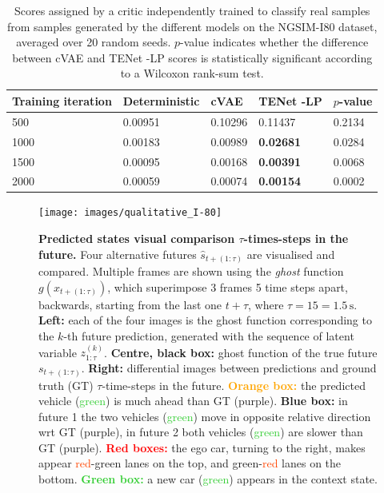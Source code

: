 \documentclass{article}
\newcommand{\modelname}{TENet }
\begin{document}
\begin{table}[t!]
  \caption{Scores assigned by a critic independently trained to classify real samples from samples generated by the different models on the NGSIM-I80 dataset, averaged over 20 random seeds. $p$-value indicates whether the difference between cVAE and \modelname-LP scores is statistically significant according to a Wilcoxon rank-sum test.}
  \label{critic-table}
  \centering
  \begin{tabular}{l|l|lll}
    \toprule
    Training iteration     & Deterministic & cVAE & \modelname-LP & $p$-value \\
    \midrule
    500 & 0.00951 & 0.10296 & 0.11437 & 0.2134 \\
    1000 & 0.00183 & 0.00989 & \textbf{0.02681} & 0.0284 \\
    1500 & 0.00095 & 0.00168 & \textbf{0.00391} & 0.0068 \\
    2000 & 0.00059 & 0.00074 & \textbf{0.00154} & 0.0002 \\
    \bottomrule
  \end{tabular}
\end{table}



\begin{figure}[t!]
  \centering
  \texttt{[image: images/qualitative\_I-80]}
  \caption{
    \textbf{Predicted states visual comparison $\tau$-times-steps in the future.}
    Four alternative futures $\hat{s}_{t+(1:\tau)}$ are visualised and compared.
    Multiple frames are shown using the \emph{ghost} function $g(x_{t+(1:\tau)})$, which superimpose 3 frames 5 time steps apart, backwards, starting from the last one $t + \tau$, where $\tau = 15 = 1.5\,\text{s}$.
    \textbf{Left:} each of the four images is the ghost function corresponding to the $k$-th future prediction, generated with the sequence of latent variable $z_{1:\tau}^{(k)}$.
    \textbf{Centre, black box:} ghost function of the true future $s_{t+(1:\tau)}$.
    \textbf{Right:} differential images between predictions  and ground truth (GT) $\tau$-time-steps in the future.
    \textcolor{Orange}{\textbf{Orange box:}} the predicted vehicle (\textcolor{LimeGreen}{green}) is much ahead than GT (\textcolor{Mulberry}{purple}).
    \textcolor{ProcessBlue}{\textbf{Blue box:}} in future 1 the two vehicles (\textcolor{LimeGreen}{green}) move in opposite relative direction wrt GT (\textcolor{Mulberry}{purple}), in future 2 both vehicles (\textcolor{LimeGreen}{green}) are slower than GT (\textcolor{Mulberry}{purple}).
    \textcolor{Red}{\textbf{Red boxes:}} the ego car, turning to the right, makes appear \textcolor{OrangeRed}{red}-\textcolor{PineGreen}{green} lanes on the top, and \textcolor{PineGreen}{green}-\textcolor{OrangeRed}{red} lanes on the bottom.
    \textcolor{LimeGreen}{\textbf{Green box:}} a new car (\textcolor{LimeGreen}{green}) appears in the context state.
  }
  \label{I-80_qual}
\end{figure}
\end{document}
